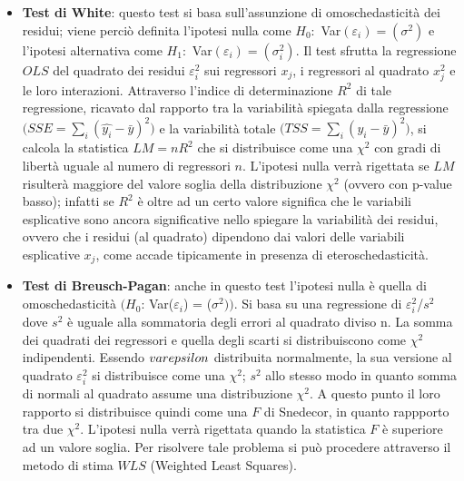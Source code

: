 \documentclass[a4page, 11pt]{article} %
\begin{document}
\begin{itemize}
\item \textbf{Test di White}: questo test si basa sull’assunzione di omoschedasticità dei residui; viene perciò definita l’ipotesi nulla come $H_0:$ Var$(\varepsilon_i) = (\sigma^2)$ e l’ipotesi alternativa come $H_1:$ Var$(\varepsilon_i ) = ( \sigma^2_i )$.
Il test sfrutta la regressione $OLS$ del quadrato dei residui $\varepsilon_i^2$ sui regressori $x_j$, i regressori al quadrato $x_j^2$ e le loro interazioni.
Attraverso l'indice di determinazione $R^{2}$ di tale regressione, ricavato dal rapporto tra la variabilità spiegata dalla regressione $\bigl(SSE = \sum_{i}(\hat{y_i} - \bar{y})^2\bigr)$ e la variabilità totale $\bigl(TSS = \sum_{i} (y_i - \bar{y})^2\bigr)$, si calcola la statistica $LM=n R^{2}$ che si distribuisce come una $\chi^{2}$ con gradi di libertà uguale al numero di regressori $n$. L’ipotesi nulla verrà rigettata se $LM$ risulterà maggiore del valore soglia della distribuzione $\chi^{2}$ (ovvero con p-value basso); %
infatti se $R^{2}$ è oltre ad un certo valore significa che le variabili esplicative sono ancora significative nello spiegare la variabilità dei residui, ovvero che i residui (al quadrato) dipendono dai valori delle variabili esplicative $x_j$, come accade tipicamente in presenza di eteroschedasticità.

\item \textbf{Test di Breusch-Pagan}: anche in questo test l’ipotesi nulla è quella di omoschedasticità $\bigl(H_0$: Var($\varepsilon_i$) = ($\sigma^2)\bigr)$.
Si basa su una regressione di $\varepsilon^{2}_i$/$s^{2}$ dove $s^{2}$ è uguale alla sommatoria degli errori al quadrato diviso n. La somma dei quadrati dei regressori e quella degli scarti si distribuiscono come $\chi^{2}$ indipendenti. Essendo $\\varepsilon$ distribuita normalmente, la sua versione al quadrato $\varepsilon_i^2$ si distribuisce come una $\chi^2$; $s^2$ allo stesso modo in quanto somma di normali al quadrato assume una distribuzione $\chi^2$. A questo punto il loro rapporto si distribuisce quindi come una $F$ di Snedecor, in quanto rappporto tra due $\chi^2$. L’ipotesi nulla verrà rigettata quando la statistica $F$ è superiore ad un valore soglia.
Per risolvere tale problema si può procedere attraverso il metodo di stima $WLS$ (Weighted Least Squares).
\end{itemize}
\end{document}
